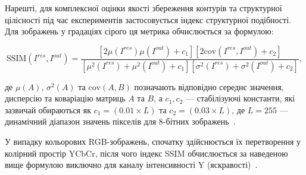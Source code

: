 Нарешті, для комплексної оцінки якості збереження контурів та структурної цілісності під час експериментів застосовується індекс структурної подібності. Для зображень у градаціях сірого ця метрика обчислюється за формулою:

\begin{equation}\tag{26}
	\text{SSIM}(I^{res}, I^{out}) = \frac{[2\mu(I^{res})\mu(I^{out}) + c_1][2\text{cov}(I^{res}, I^{out}) + c_2]}{[\mu^2(I^{res}) + \mu^2(I^{out}) + c_1][\sigma^2(I^{res}) + \sigma^2(I^{out}) + c_2]},
\end{equation}

де $\mu(A)$, $\sigma^2(A)$ та $\text{cov}(A,B)$ позначають відповідно середнє значення, дисперсію та коваріацію матриць $A$ та $B$, а $c_1, c_2$ --- стабілізуючі константи, які зазвичай обираються як $c_1 = (0.01 \times L)$ та $c_2 = (0.03 \times L)$, де $L = 255$ --- динамічний діапазон значень пікселів для 8-бітних зображень~\cite{occorsio2022lagrange}. 

У випадку кольорових RGB-зображень, спочатку здійснюється їх перетворення у колірний простір YCbCr, після чого індекс SSIM обчислюється за наведеною вище формулою виключно для каналу інтенсивності Y (яскравості)~\cite{occorsio2022lagrange}.